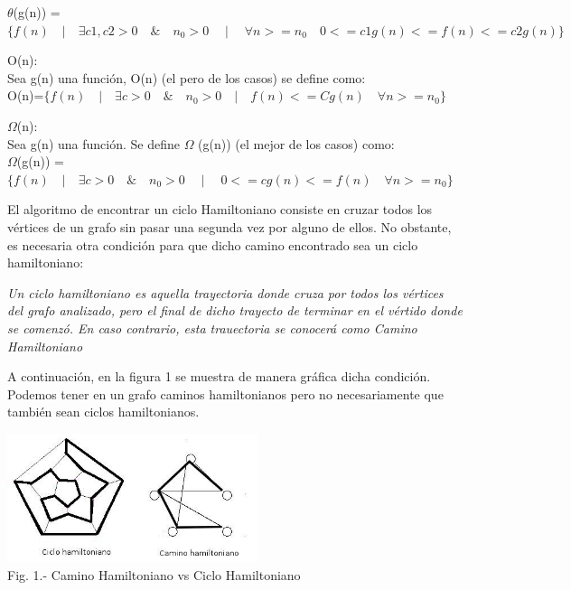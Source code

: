 \documentclass[spanish]{article}
\begin{document}
		 	$\theta$(g(n)) = $\{ f(n) \quad | \quad \exists c1,c2>0 \quad \& \quad n_{0}>0 \quad \mid \quad \forall n>=n_{0} \quad 0<= c1g(n) <= f(n) <= c2g(n) \}$
	\bigskip		 	
		 	
	O(n):\\
		Sea  g(n)  una función, O(n) (el pero de los casos) se define como:\\
		
			\hspace{1cm}O(n)=$\{f(n) \quad | \quad \exists c >0 \quad \& \quad n_{0}>0 \quad | \quad f(n) <= Cg(n) \quad \forall  n>= n_{0} \}$
	\bigskip
	
	$\Omega$(n):\\
	Sea  g(n)  una función. Se define $\Omega$ (g(n)) (el mejor de los casos) como:\\

		\hspace{1cm}$\Omega$(g(n)) =$\{f(n) \quad | \quad \exists c >0 \quad \& \quad n_{0}>0 \quad \mid \quad  0<= cg(n)<= f(n) \quad \forall n>= n_{0} \}$
	\bigskip
	
	El algoritmo de encontrar un ciclo Hamiltoniano consiste en cruzar todos los vértices de un grafo sin pasar una segunda vez por alguno de ellos. No obstante, es necesaria otra condición para que dicho camino encontrado sea un ciclo hamiltoniano:

	\begin{center}
		\textit{Un ciclo hamiltoniano es aquella trayectoria donde cruza por todos los vértices del grafo analizado, pero el final de dicho trayecto de terminar en el vértido donde se comenzó. En caso contrario, esta trauectoria se conocerá como Camino Hamiltoniano}
	\end{center}

	A continuación, en la figura 1 se muestra de manera gráfica dicha condición. Podemos tener en un grafo caminos hamiltonianos pero no necesariamente que también sean ciclos hamiltonianos.

	\begin{center}
		\includegraphics[width=0.55\textwidth]{./imagenes/ciclo_camino_ham.png}\\
		Fig. 1.- Camino Hamiltoniano vs Ciclo Hamiltoniano\\
	\end{center}
\end{document}
